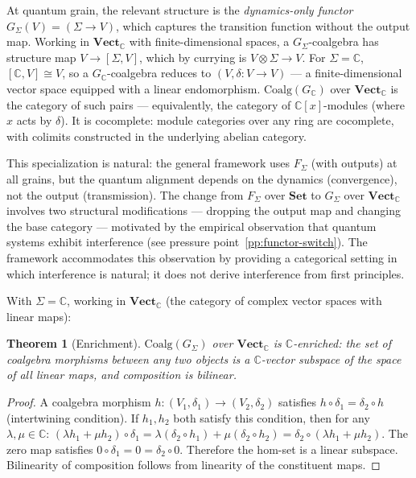 \documentclass[12pt,a4paper]{article}
\newtheorem{theorem}{Theorem}
\begin{document}
At quantum grain, the relevant structure is the \emph{dynamics-only functor} $G_\Sigma(V) = (\Sigma \to V)$, which captures the transition function without the output map. Working in $\mathbf{Vect}_{\mathbb{C}}$ with finite-dimensional spaces, a $G_\Sigma$-coalgebra has structure map $V \to [\Sigma, V]$, which by currying is $V \otimes \Sigma \to V$. For $\Sigma = \mathbb{C}$, $[\mathbb{C}, V] \cong V$, so a $G_\mathbb{C}$-coalgebra reduces to $(V, \delta : V \to V)$ --- a finite-dimensional vector space equipped with a linear endomorphism. $\text{Coalg}(G_\mathbb{C})$ over $\mathbf{Vect}_{\mathbb{C}}$ is the category of such pairs --- equivalently, the category of $\mathbb{C}[x]$-modules (where $x$ acts by $\delta$). It is cocomplete: module categories over any ring are cocomplete, with colimits constructed in the underlying abelian category.

This specialization is natural: the general framework uses $F_\Sigma$ (with outputs) at all grains, but the quantum alignment depends on the dynamics (convergence), not the output (transmission). The change from $F_\Sigma$ over $\mathbf{Set}$ to $G_\Sigma$ over $\mathbf{Vect}_{\mathbb{C}}$ involves two structural modifications --- dropping the output map and changing the base category --- motivated by the empirical observation that quantum systems exhibit interference (see pressure point~\ref{pp:functor-switch}). The framework accommodates this observation by providing a categorical setting in which interference is natural; it does not derive interference from first principles.

With $\Sigma = \mathbb{C}$, working in $\mathbf{Vect}_{\mathbb{C}}$ (the category of complex vector spaces with linear maps):

\begin{theorem}[Enrichment]
\label{thm:enrichment}
$\text{Coalg}(G_\Sigma)$ over $\mathbf{Vect}_{\mathbb{C}}$ is $\mathbb{C}$-enriched: the set of coalgebra morphisms between any two objects is a $\mathbb{C}$-vector subspace of the space of all linear maps, and composition is bilinear.
\end{theorem}

\begin{proof}
A coalgebra morphism $h : (V_1, \delta_1) \to (V_2, \delta_2)$ satisfies $h \circ \delta_1 = \delta_2 \circ h$ (intertwining condition). If $h_1, h_2$ both satisfy this condition, then for any $\lambda, \mu \in \mathbb{C}$: $(\lambda h_1 + \mu h_2) \circ \delta_1 = \lambda(\delta_2 \circ h_1) + \mu(\delta_2 \circ h_2) = \delta_2 \circ (\lambda h_1 + \mu h_2)$. The zero map satisfies $0 \circ \delta_1 = 0 = \delta_2 \circ 0$. Therefore the hom-set is a linear subspace. Bilinearity of composition follows from linearity of the constituent maps.
\end{proof}
\end{document}

